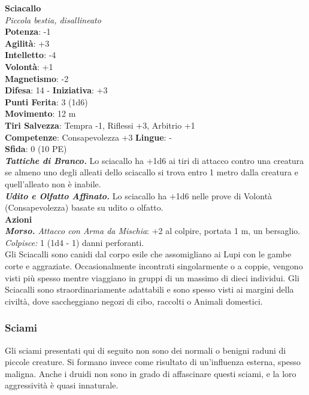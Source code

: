 \begin{multicols}{2}
\medskip\textbf{Sciacallo}\\
\emph{Piccola bestia, disallineato}\\
\textbf{Potenza}: -1\\
\textbf{Agilità}: +3\\
\textbf{Intelletto}: -4\\
\textbf{Volontà}: +1\\
\textbf{Magnetismo}: -2\\
\textbf{Difesa}: 14 - \textbf{Iniziativa}: +3\\
\textbf{Punti Ferita}: 3 (1d6)\\
\textbf{Movimento}: 12 m\\
\textbf{Tiri Salvezza}: Tempra -1, Riflessi +3, Arbitrio +1\\
\textbf{Competenze}: Consapevolezza +3
\textbf{Lingue}: -\\
\textbf{Sfida}: 0 (10 PE)\smallskip\\
\emph{\textbf{Tattiche di Branco.}} Lo sciacallo ha +1d6 ai tiri di attacco contro una creatura se almeno uno degli alleati dello sciacallo si trova entro 1 metro dalla creatura e quell'alleato non è inabile.\\
\emph{\textbf{Udito e Olfatto Affinato.}} Lo sciacallo ha +1d6 nelle prove di Volontà (Consapevolezza) basate su udito o olfatto.\\
\smallskip\textbf{Azioni}\\
\emph{\textbf{Morso.} Attacco con Arma da Mischia}: +2 al colpire, portata 1 m, un bersaglio.\\
\emph{Colpisce:} 1 (1d4 - 1) danni perforanti.\\
Gli Sciacalli sono canidi dal corpo esile che assomigliano ai Lupi con le gambe corte e aggraziate. Occasionalmente incontrati singolarmente o a coppie, vengono visti più spesso mentre viaggiano in gruppi di un massimo di dieci individui. Gli Sciacalli sono straordinariamente adattabili e sono spesso visti ai margini della civiltà, dove saccheggiano negozi di cibo, raccolti o Animali domestici.\\

\subsubsection{Sciami}

Gli sciami presentati qui di seguito non sono dei normali o benigni raduni di piccole creature. Si formano invece come risultato di un'influenza esterna, spesso maligna. Anche i druidi non sono in grado di affascinare questi sciami, e la loro aggressività è quasi innaturale.\\


\end{multicols}
